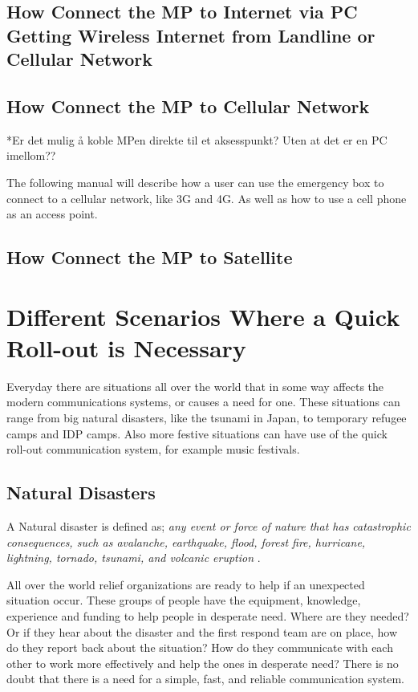\subsection{How Connect the MP to Internet via PC Getting Wireless Internet from Landline or Cellular Network}


\subsection{How Connect the MP to Cellular Network}
*Er det mulig å koble MPen direkte til et aksesspunkt? Uten at det er en PC imellom??

The following manual will describe how a user can use the emergency box to connect to a cellular network, like 3G and 4G. As well as how to use a cell phone as an access point. 



\subsection{How Connect the MP to Satellite}


 
\section{Different Scenarios Where a Quick Roll-out is Necessary}
Everyday there are situations all over the world that in some way affects the modern communications systems, or causes a need for one.  These situations can range from big natural disasters, like the tsunami in Japan, to temporary refugee camps and IDP camps. Also more festive situations can have use of the quick roll-out communication system, for example music festivals. 

\subsection{Natural Disasters}
A Natural disaster is defined as; \textit{any event or force of nature that has catastrophic consequences, such as avalanche, earthquake, flood, forest fire, hurricane, lightning, tornado, tsunami, and volcanic eruption} \cite{naturalDisaster}.

All over the world relief organizations are ready to help if an unexpected situation occur. These groups of people have the equipment, knowledge, experience and funding to help people in desperate need. Where are they needed? Or if they hear about the disaster and the first respond team are on place, how do they report back about the situation? How do they communicate with each other to work more effectively and help the ones in desperate need? There is no doubt that there is a need for a simple, fast, and reliable communication system.

